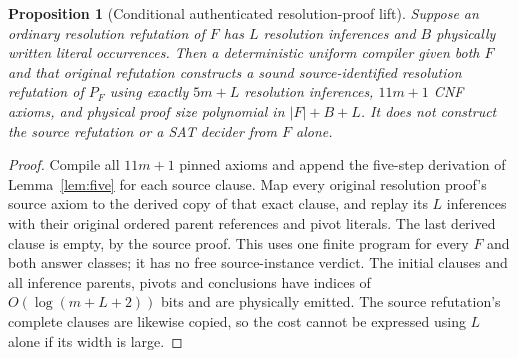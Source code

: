 \documentclass[11pt]{article}
\newtheorem{proposition}[theorem]{Proposition}
\begin{document}
\begin{proposition}[Conditional authenticated resolution-proof lift]\label{prop:lift}
Suppose an ordinary resolution refutation of $F$ has $L$ resolution inferences and $B$ physically written literal occurrences. Then a deterministic uniform compiler given \emph{both $F$ and that original refutation} constructs a sound source-identified resolution refutation of $P_F$ using exactly $5m+L$ resolution inferences, $11m+1$ CNF axioms, and physical proof size polynomial in $|F|+B+L$. It does \emph{not} construct the source refutation or a SAT decider from $F$ alone.
\end{proposition}
\begin{proof}
Compile all $11m+1$ pinned axioms and append the five-step derivation of Lemma~\ref{lem:five} for each source clause. Map every original resolution proof's source axiom to the derived copy of that exact clause, and replay its $L$ inferences with their original ordered parent references and pivot literals. The last derived clause is empty, by the source proof. This uses one finite program for every $F$ and both answer classes; it has no free source-instance verdict. The initial clauses and all inference parents, pivots and conclusions have indices of $O(\log(m+L+2))$ bits and are physically emitted. The source refutation's complete clauses are likewise copied, so the cost cannot be expressed using $L$ alone if its width is large.
\end{proof}
\end{document}
